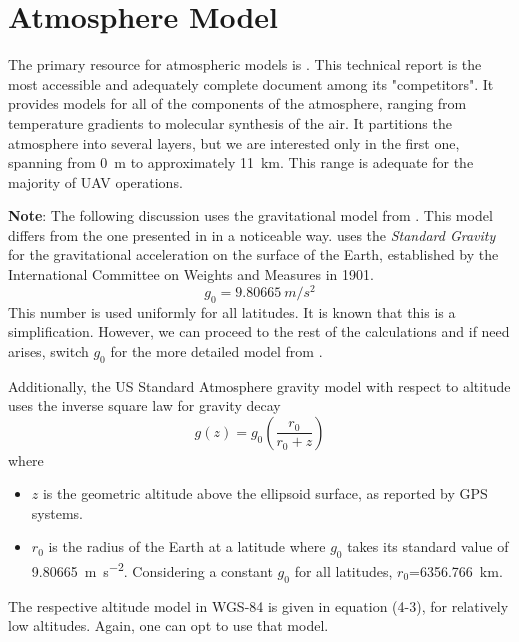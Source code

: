 \section{Atmosphere Model}\label{sec:atm_model}
The primary resource for atmospheric models is \cite{USStdAtm76}. This technical report is the most accessible and adequately complete document among its "competitors". It provides models for all of the components of the atmosphere, ranging from temperature gradients to molecular synthesis of the air. It partitions the atmosphere into several layers, but we are interested only in the first one, spanning from \SI{0}{\m} to approximately \SI{11}{\kilo \m}. This range is adequate for the majority of UAV operations.

\textbf{Note}: The following discussion uses the gravitational model from \cite[eq.~17]{USStdAtm76}. This model differs from the one presented in \cite{Mulaire2000} in a noticeable way. \cite{USStdAtm76} uses the \emph{Standard Gravity} for the gravitational acceleration on the surface of the Earth, established by the International Committee on Weights and Measures in 1901.
\begin{equation} \label{eq:stdGravity}
	g_0 = 9.80665~ m/s^2
\end{equation}
This number is used uniformly for all latitudes. It is known that this is a simplification. However, we can proceed to the rest of the calculations and if need arises, switch $g_0$ for the more detailed model from \cite[eq.~4-1]{Mulaire2000}.

Additionally, the US Standard Atmosphere gravity model with respect to altitude uses the inverse square law for gravity decay
\begin{equation} \label{eq:usstdatmGravAlt}
	g(z) = g_0 \left(\frac{r_0}{r_0+z}\right)
\end{equation}
where
\begin{itemize}
	\item $z$ is the geometric altitude above the ellipsoid surface, as reported by GPS systems.
	\item $r_0$ is the radius of the Earth at a latitude where $g_0$ takes its standard value of \SI{9.80665}{\m \per \square \s}. Considering a constant $g_0$ for all latitudes, $r_0$=\SI{6356.766}{\kilo \meter}.
\end{itemize}
The respective altitude model in WGS-84 is given in equation (4-3), for relatively low altitudes. Again, one can opt to use that model.

